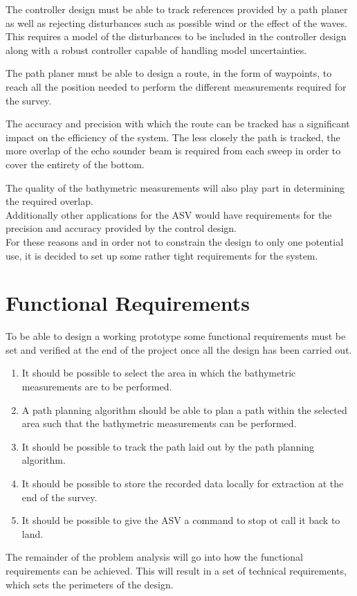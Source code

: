 The controller design must be able to track references provided by a path planer as well as rejecting disturbances such as possible wind or the effect of the waves. This requires a model of the disturbances to be included in the controller design along with a robust controller capable of handling model uncertainties.

The path planer must be able to design a route, in the form of waypoints, to reach all the position needed to perform the different measurements required for the survey.

The accuracy and precision with which the route can be tracked has a significant impact on the efficiency of the system. The less closely the path is tracked, the more overlap of the echo sounder beam is required from each sweep in order to cover the entirety of the bottom.

The quality of the bathymetric measurements will also play part in determining the required overlap.\\
Additionally other applications for the ASV would have requirements for the precision and accuracy provided by the control design.\\
For these reasons and in order not to constrain the design to only one potential use, it is decided to set up some rather tight requirements for the system.

\section{Functional Requirements} \label{sec:requirements}
To be able to design a working prototype some functional requirements must be set and verified at the end of the project once all the design has been carried out.
%
\begin{enumerate}
  \item It should be possible to select the area in which the bathymetric measurements are to be performed.
  \item A path planning algorithm should be able to plan a path within the selected area such that the bathymetric measurements can be performed.
  \item It should be possible to track the path laid out by the path planning algorithm.
  \item It should be possible to store the recorded data locally for extraction at the end of the survey.
  \item It should be possible to give the ASV a command to stop ot call it back to land.
\end{enumerate}
%
The remainder of the problem analysis will go into how the functional requirements can be achieved. This will result in a set of technical requirements, which sets the perimeters of the design.

